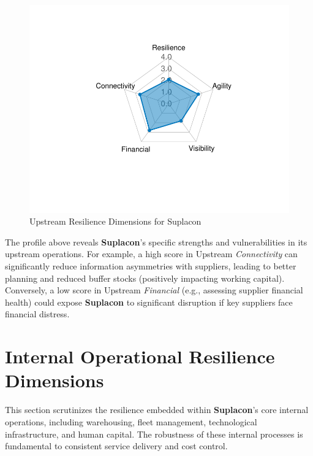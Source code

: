 \documentclass[
  oneside,
  open=any,
  fontsize=11pt]{scrbook}
\begin{document}
\begin{figure}[H]

{\centering \includegraphics[width=0.8\linewidth,height=\textheight,keepaspectratio]{example_3_files/figure-pdf/upstream-radar-chart-1.pdf}

}

\caption{Upstream Resilience Dimensions for Suplacon}

\end{figure}%

The profile above reveals \textbf{Suplacon}'s specific strengths and
vulnerabilities in its upstream operations. For example, a high score in
Upstream \emph{Connectivity} can significantly reduce information
asymmetries with suppliers, leading to better planning and reduced
buffer stocks (positively impacting working capital). Conversely, a low
score in Upstream \emph{Financial} (e.g., assessing supplier financial
health) could expose \textbf{Suplacon} to significant disruption if key
suppliers face financial distress.

\section{Internal Operational Resilience
Dimensions}\label{internal-operational-resilience-dimensions}

This section scrutinizes the resilience embedded within
\textbf{Suplacon}'s core internal operations, including warehousing,
fleet management, technological infrastructure, and human capital. The
robustness of these internal processes is fundamental to consistent
service delivery and cost control.
\end{document}
